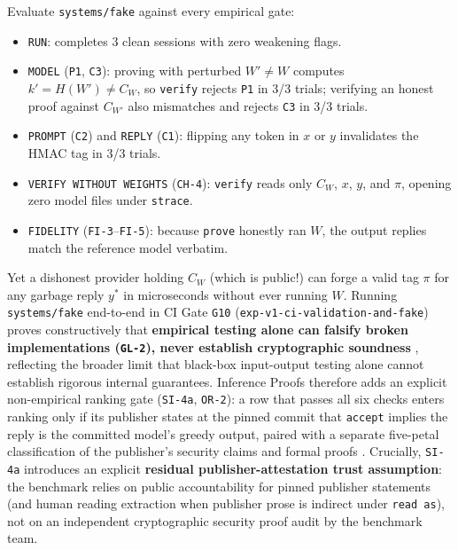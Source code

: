 \documentclass[11pt,letterpaper]{article}
\begin{document}
Evaluate \texttt{systems/\allowbreak{}fake} against every empirical gate:

\begin{itemize}
\item \texttt{RUN}: completes 3 clean sessions with zero weakening flags.
\item \texttt{MODEL} (\texttt{P1}, \texttt{C3}): proving with perturbed $W' \ne W$ computes $k' = H(W') \ne C_W$, so \texttt{verify} rejects \texttt{P1} in 3/3 trials; verifying an honest proof against $C_{W'}$ also mismatches and rejects \texttt{C3} in 3/3 trials.
\item \texttt{PROMPT} (\texttt{C2}) and \texttt{REPLY} (\texttt{C1}): flipping any token in $x$ or $y$ invalidates the HMAC tag in 3/3 trials.
\item \texttt{VERIFY WITHOUT WEIGHTS} (\texttt{CH-4}): \texttt{verify} reads only $C_W$, $x$, $y$, and $\pi$, opening zero model files under \texttt{strace}.
\item \texttt{FIDELITY} (\texttt{FI-3}--\texttt{FI-5}): because \texttt{prove} honestly ran $W$, the output replies match the reference model verbatim.
\end{itemize}

Yet a dishonest provider holding $C_W$ (which is public!) can forge a valid tag $\pi$ for any garbage reply $y^*$ in microseconds without ever running $W$. Running \texttt{systems/\allowbreak{}fake} end-to-end in CI Gate \texttt{G10} (\texttt{exp-\allowbreak{}v1-\allowbreak{}ci-\allowbreak{}validation-\allowbreak{}and-\allowbreak{}fake}) proves constructively that \textbf{empirical testing alone can falsify broken implementations (\texttt{GL-2}), never establish cryptographic soundness} \cite{iproofs2026}, reflecting the broader limit that black-box input-output testing alone cannot establish rigorous internal guarantees. Inference Proofs therefore adds an explicit non-empirical ranking gate (\texttt{SI-4a}, \texttt{OR-2}): a row that passes all six checks enters ranking only if its publisher states at the pinned commit that \texttt{accept} implies the reply is the committed model's greedy output, paired with a separate five-petal classification of the publisher's security claims and formal proofs \cite{iproofs2026}. Crucially, \texttt{SI-4a} introduces an explicit \textbf{residual publisher-attestation trust assumption}: the benchmark relies on public accountability for pinned publisher statements (and human reading extraction when publisher prose is indirect under \texttt{read as}), not on an independent cryptographic security proof audit by the benchmark team.
\end{document}
